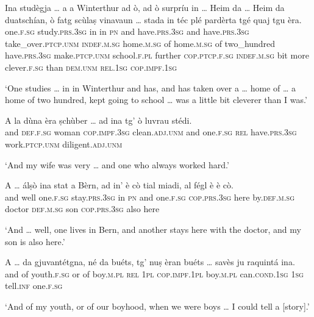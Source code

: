 \begin{linenumbers}
\gll    Ina studègja … a a Winterthur ad ò, ad ò surpríu in … Heim\footnotemark{} da … Heim da duatschían, ò fatg scùlaṣ vinavaun … stada in téc plé pardèrta tgé quaj tgu èra.\\
one.\textsc{f.sg} study.\textsc{prs.3sg} {} in in \textsc{pn} and have.\textsc{prs.3sg} and  have.\textsc{prs.3sg} take\_over.\textsc{ptcp.unm} \textsc{indef.m.sg} {} home.\textsc{m.sg} of {}  home.\textsc{m.sg} of two\_hundred have.\textsc{prs.3sg} make.\textsc{ptcp.unm} school.\textsc{f.pl} further {} \textsc{cop.ptcp.f.sg} \textsc{indef.m.sg} bit more  clever.\textsc{f.sg} than \textsc{dem.unm} \textsc{rel.1sg} \textsc{cop.impf.1sg} \\
\end{linenumbers}
\medskip
\glt `One studies … in in Winterthur and has, and has taken over a … home of … a home of two hundred, kept going to school … was a little bit cleverer than I was.'
\medskip

\begin{linenumbers}
\gll    A la dùna èra ṣchùber … ad ina tg’ ò luvrau stédi.\\
and \textsc{def.f.sg} woman \textsc{cop.impf.3sg} clean.\textsc{adj.unm} {} and one.\textsc{f.sg} \textsc{rel} have.\textsc{prs.3sg} work.\textsc{ptcp.unm} diligent.\textsc{adj.unm} \\
\end{linenumbers}
\medskip
\glt `And my wife was very … and one who always worked hard.'
\medskip

\begin{linenumbers}
\gll    A … álṣò ina stat a Bèrn, ad in’ è cò tial miadi, al fégl è è cò.\\
and {} well one.\textsc{f.sg} stay.\textsc{prs.3sg} in \textsc{pn} and one.\textsc{f.sg} \textsc{cop.prs.3sg} here by.\textsc{def.m.sg} doctor \textsc{def.m.sg} son \textsc{cop.prs.3sg} also here\\
\end{linenumbers}
\medskip
\glt `And … well, one lives in Bern, and another stays here with the doctor, and my son is also here.'
\medskip

\begin{linenumbers}
\gll A … da gjuvantétgna, né da buéts, tg’ nuṣ èran buéts … savès ju raquintá ina.\\
and {} of  youth.\textsc{f.sg} or of boy.\textsc{m.pl} \textsc{rel} \textsc{1pl} \textsc{cop.impf.1pl} boy.\textsc{m.pl} {} can.\textsc{cond.1sg} \textsc{1sg} tell.\textsc{inf} one.\textsc{f.sg}\\
\end{linenumbers}
\medskip
\glt `And of my youth, or of our boyhood, when we were boys … I could tell a [story].'
\medskip

